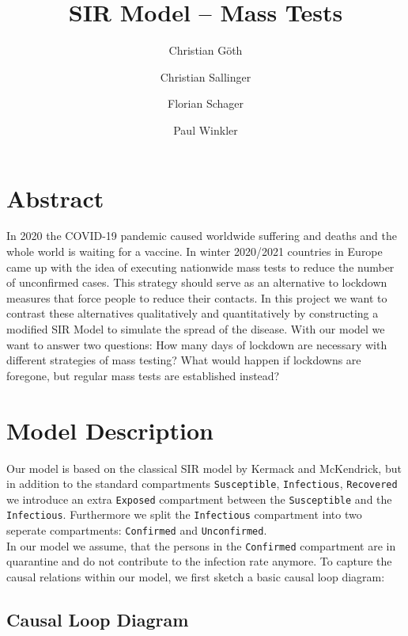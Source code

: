 \documentclass
[
    a4paper,
    11pt,
    bibliography = totoc,
    listof = totoc,
    headinclude = true,
]
{scrreport}
\begin{document}
\subject{Modeling \& Simulation}
\title{SIR Model -- Mass Tests}

\publishers{Betreuer: Martin Bicher}


\author{
Christian Göth \and
Christian Sallinger \and
Florian Schager \and
Paul Winkler
}


\maketitle

\chapter*{Abstract}

In 2020 the COVID-19 pandemic caused worldwide suffering and deaths and the
whole world is waiting for a vaccine. In winter 2020/2021 countries in Europe
came up with the idea of executing nationwide mass tests to reduce the number
of unconfirmed cases. This strategy should serve as an alternative to
lockdown measures that force people to reduce their contacts.
In this project we want to contrast these alternatives qualitatively and quantitatively
by constructing a modified SIR Model to simulate the spread of the disease.
With our model we want to answer two questions:
How many days of lockdown are necessary with different strategies of mass testing?
What would happen if lockdowns are foregone, but regular mass tests are established instead?

\tableofcontents


\chapter{Model Description}

Our model is based on the classical SIR model by Kermack and McKendrick,
but in addition to the standard compartments \texttt{Susceptible}, \texttt{Infectious}, \texttt{Recovered} we introduce an extra \texttt{Exposed} compartment between the \texttt{Susceptible} and the \texttt{Infectious}.
Furthermore we split the \texttt{Infectious} compartment into two seperate compartments:
\texttt{Confirmed} and \texttt{Unconfirmed}. \\
In our model we assume, that the persons in the \texttt{Confirmed} compartment are in
quarantine and do not contribute to the infection rate anymore.
To capture the causal relations within our model, we first sketch a basic
causal loop diagram:

\section{Causal Loop Diagram}
\end{document}
